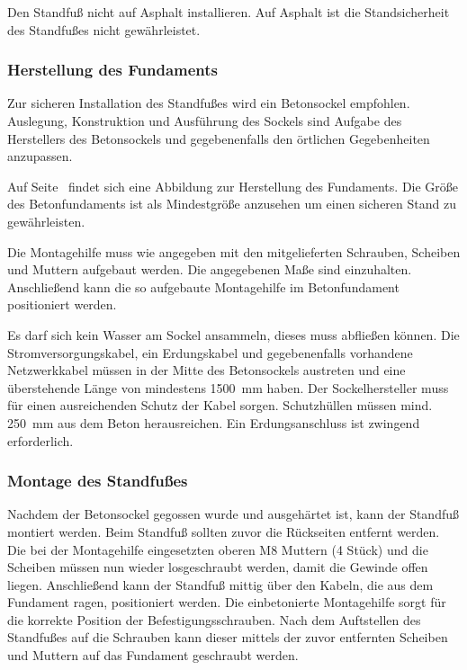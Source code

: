 \documentclass[a4paper,10pt]{article}
\newcommand{\hint}[1]{\begin{tcolorbox}[colback=boxgray,colframe=black,coltext=
white,title=Hinweis]#1\end{tcolorbox}}
\begin{document}
\begin{multicols*}{2}
    \hint{Den Standfuß nicht auf Asphalt installieren. Auf Asphalt ist die
	Standsicherheit des Standfußes nicht gewährleistet.}


	\subsubsection{Herstellung des Fundaments}
    Zur sicheren Installation des Standfußes wird ein Betonsockel empfohlen.
	Auslegung, Konstruktion und Ausführung des Sockels sind Aufgabe des
	Herstellers des Betonsockels und gegebenenfalls den örtlichen Gegebenheiten
	anzupassen.

	Auf Seite~\pageref{appendix_base} findet sich eine
	Abbildung zur Herstellung des Fundaments. Die Größe des Betonfundaments ist als
	Mindestgröße anzusehen um einen sicheren Stand zu gewährleisten.

	Die Montagehilfe muss wie angegeben mit den mitgelieferten Schrauben,
	Scheiben und Muttern aufgebaut werden. Die angegebenen Maße sind
	einzuhalten. Anschließend kann die so aufgebaute Montagehilfe im
	Betonfundament positioniert werden.

	Es darf sich kein Wasser am Sockel ansammeln, dieses muss abfließen können. Die
	Stromversorgungskabel, ein Erdungskabel und gegebenenfalls vorhandene Netzwerkkabel müssen in der Mitte
	des Betonsockels austreten und eine überstehende Länge von mindestens
	\SI{1500}{\milli\meter} haben. Der Sockelhersteller muss
	für einen ausreichenden Schutz der Kabel sorgen. Schutzhüllen müssen mind.
	\SI{250}{\milli\meter} aus dem Beton herausreichen. Ein Erdungsanschluss ist
	zwingend erforderlich.

	\subsubsection{Montage des Standfußes}
	Nachdem der Betonsockel gegossen wurde und ausgehärtet ist, kann
	der Standfuß montiert werden. Beim Standfuß sollten zuvor die Rückseiten
	entfernt werden. Die bei der Montagehilfe
	eingesetzten oberen M8 Muttern (4 Stück) und die Scheiben müssen nun wieder losgeschraubt werden,
	damit die Gewinde offen liegen. Anschließend kann der Standfuß mittig über den
	Kabeln, die aus dem Fundament ragen, positioniert werden. Die
	einbetonierte Montagehilfe sorgt für die korrekte Position der
	Befestigungsschrauben. Nach dem Auftstellen des Standfußes auf die Schrauben kann dieser
	mittels der zuvor entfernten Scheiben und Muttern auf das Fundament
	geschraubt werden.


\end{multicols*}
\end{document}
